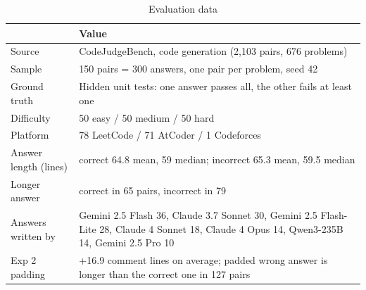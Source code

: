 \begin{table}[t]
\centering
\caption{Evaluation data}
\label{tab:t0_data}
\footnotesize
\setlength{\tabcolsep}{3pt}
\begin{tabular}{p{}p{}}
\hline
 & Value \\
\hline
Source & CodeJudgeBench, code generation (2,103 pairs, 676 problems) \\
Sample & 150 pairs = 300 answers, one pair per problem, seed 42 \\
Ground truth & Hidden unit tests: one answer passes all, the other fails at least one \\
Difficulty & 50 easy / 50 medium / 50 hard \\
Platform & 78 LeetCode / 71 AtCoder / 1 Codeforces \\
Answer length (lines) & correct 64.8 mean, 59 median; incorrect 65.3 mean, 59.5 median \\
Longer answer & correct in 65 pairs, incorrect in 79 \\
Answers written by & Gemini 2.5 Flash 36, Claude 3.7 Sonnet 30, Gemini 2.5 Flash-Lite 28, Claude 4 Sonnet 18, Claude 4 Opus 14, Qwen3-235B 14, Gemini 2.5 Pro 10 \\
Exp 2 padding & +16.9 comment lines on average; padded wrong answer is longer than the correct one in 127 pairs \\
\hline
\end{tabular}
\end{table}
